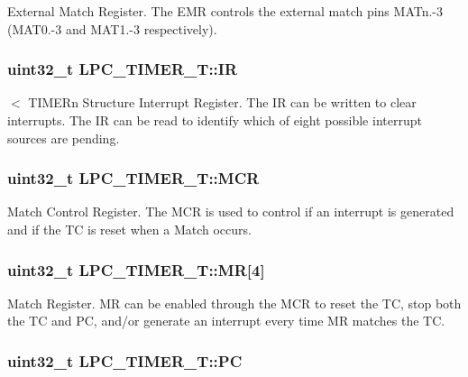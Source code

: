External Match Register. The E\-M\-R controls the external match pins M\-A\-Tn.-\/3 (M\-A\-T0.-\/3 and M\-A\-T1.-\/3 respectively). \hypertarget{structLPC__TIMER__T_a3db61fe5ab56aeea0c27c6199da63b1a}{
\subsubsection[{I\-R}]{ uint32\-\_\-t L\-P\-C\-\_\-\-T\-I\-M\-E\-R\-\_\-\-T\-::\-I\-R}}\label{structLPC__TIMER__T_a3db61fe5ab56aeea0c27c6199da63b1a}
$<$ T\-I\-M\-E\-Rn Structure Interrupt Register. The I\-R can be written to clear interrupts. The I\-R can be read to identify which of eight possible interrupt sources are pending. \hypertarget{structLPC__TIMER__T_a7696d9896a932a78d6a6a60488332674}{
\subsubsection[{M\-C\-R}]{ uint32\-\_\-t L\-P\-C\-\_\-\-T\-I\-M\-E\-R\-\_\-\-T\-::\-M\-C\-R}}\label{structLPC__TIMER__T_a7696d9896a932a78d6a6a60488332674}
Match Control Register. The M\-C\-R is used to control if an interrupt is generated and if the T\-C is reset when a Match occurs. \hypertarget{structLPC__TIMER__T_a26e8addd98189542175c5ecbcd8d3776}{
\subsubsection[{M\-R}]{ uint32\-\_\-t L\-P\-C\-\_\-\-T\-I\-M\-E\-R\-\_\-\-T\-::\-M\-R\mbox{[}4\mbox{]}}}\label{structLPC__TIMER__T_a26e8addd98189542175c5ecbcd8d3776}
Match Register. M\-R can be enabled through the M\-C\-R to reset the T\-C, stop both the T\-C and P\-C, and/or generate an interrupt every time M\-R matches the T\-C. \hypertarget{structLPC__TIMER__T_aff47df94f3c3f882c742af874983ffb9}{
\subsubsection[{P\-C}]{ uint32\-\_\-t L\-P\-C\-\_\-\-T\-I\-M\-E\-R\-\_\-\-T\-::\-P\-C}}\label{structLPC__TIMER__T_aff47df94f3c3f882c742af874983ffb9}

